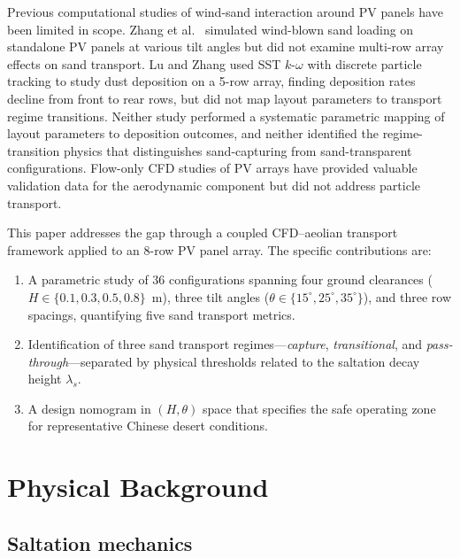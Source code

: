 \documentclass[preprint,12pt,review]{elsarticle}
\begin{document}
Previous computational studies of wind-sand interaction around PV panels have been limited in scope. Zhang et al.\ \cite{zhang2024cfd} simulated wind-blown sand loading on standalone PV panels at various tilt angles but did not examine multi-row array effects on sand transport. Lu and Zhang \cite{lu2019influences} used SST $k$-$\omega$ with discrete particle tracking to study dust deposition on a 5-row array, finding deposition rates decline from front to rear rows, but did not map layout parameters to transport regime transitions. Neither study performed a systematic parametric mapping of layout parameters to deposition outcomes, and neither identified the regime-transition physics that distinguishes sand-capturing from sand-transparent configurations. Flow-only CFD studies of PV arrays \cite{jubayer2016numerical,shademan2014numerical} have provided valuable validation data for the aerodynamic component but did not address particle transport.

This paper addresses the gap through a coupled CFD--aeolian transport framework applied to an 8-row PV panel array. The specific contributions are:

\begin{enumerate}
  \item A parametric study of 36 configurations spanning four ground clearances ($H \in \{0.1, 0.3, 0.5, 0.8\}$~m), three tilt angles ($\theta \in \{15^\circ, 25^\circ, 35^\circ\}$), and three row spacings, quantifying five sand transport metrics.
  \item Identification of three sand transport regimes---\emph{capture}, \emph{transitional}, and \emph{pass-through}---separated by physical thresholds related to the saltation decay height $\lambda_s$.
  \item A design nomogram in $(H, \theta)$ space that specifies the safe operating zone for representative Chinese desert conditions.
\end{enumerate}

\section{Physical Background}
\label{sec:physics}

\subsection{Saltation mechanics}
\end{document}
